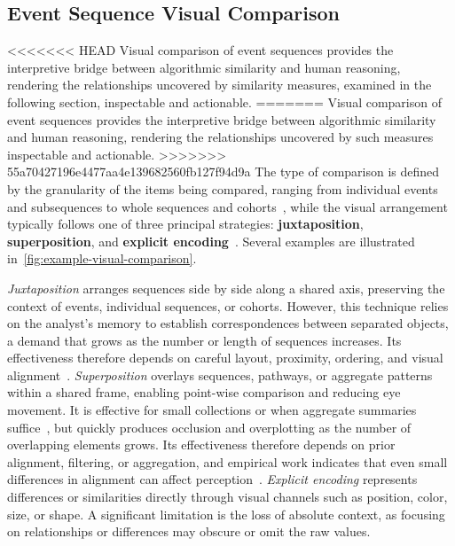 \subsection{Event Sequence Visual Comparison}

<<<<<<< HEAD
Visual comparison of event sequences provides the interpretive bridge between algorithmic similarity and human reasoning, rendering the relationships uncovered by similarity measures, examined in the following section, inspectable and actionable.
=======
Visual comparison of event sequences provides the interpretive bridge between algorithmic similarity and human reasoning, rendering the relationships uncovered by such measures inspectable and actionable.
>>>>>>> 55a70427196e4477aa4e139682560fb127f94d9a
The type of comparison is defined by the granularity of the items being compared, ranging from individual events and subsequences to whole sequences and cohorts~\cite{linden2023survey}, while the visual arrangement typically follows one of three principal strategies: \textbf{juxtaposition}, \textbf{superposition}, and \textbf{explicit encoding}~\cite{gleicher2011visual, gleicher2018considerations}.
Several examples are illustrated in~\cref{fig:example-visual-comparison}.

\textit{Juxtaposition} arranges sequences side by side along a shared axis, preserving the context of events, individual sequences, or cohorts.
However, this technique relies on the analyst's memory to establish correspondences between separated objects, a demand that grows as the number or length of sequences increases.
Its effectiveness therefore depends on careful layout, proximity, ordering, and visual alignment~\cite{tufte2006beautiful}.
\textit{Superposition} overlays sequences, pathways, or aggregate patterns within a shared frame, enabling point-wise comparison and reducing eye movement.
It is effective for small collections or when aggregate summaries suffice~\cite{guo2018eventthread, guo2019visual}, but quickly produces occlusion and overplotting as the number of overlapping elements grows.
Its effectiveness therefore depends on prior alignment, filtering, or aggregation, and empirical work indicates that even small differences in alignment can affect perception~\cite{zhang2019evaluating}.
\textit{Explicit encoding} represents differences or similarities directly through visual channels such as position, color, size, or shape.
A significant limitation is the loss of absolute context, as focusing on relationships or differences may obscure or omit the raw values.

